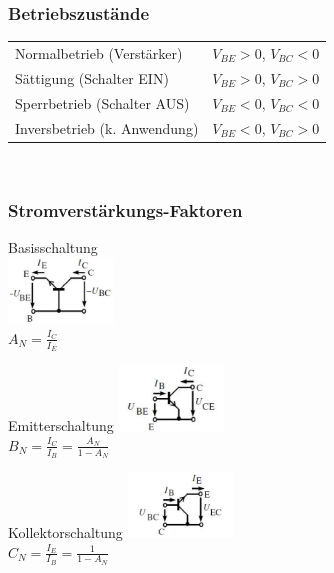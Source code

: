 	\begin{multicols}{2}
	\subsubsection{Betriebszustände}
		\begin{tabular}{l l}
			Normalbetrieb (Verstärker) & $V_{BE} > 0$, $V_{BC} < 0$\\
			Sättigung (Schalter EIN) & $V_{BE} > 0$, $V_{BC} > 0$\\
			Sperrbetrieb (Schalter AUS) & $V_{BE} < 0$, $V_{BC} < 0$\\
			Inversbetrieb (k. Anwendung) & $V_{BE} < 0$, $V_{BC} > 0$
		\end{tabular} \\
	\columnbreak
	\subsubsection{Stromverstärkungs-Faktoren}
		\begin{minipage}[c]{2.8cm}
			Basisschaltung \\
			\includegraphics[width=2.8cm]{images/bip-basissch}\\
			$A_N=\frac{I_C}{I_E}$ \\
		\end{minipage}
		\begin{minipage}[c]{2.8cm}
			Emitterschaltung
			\includegraphics[width=2.8cm]{images/bip-emittersch}\\
			$B_N=\frac{I_C}{I_B}=\frac{A_N}{1-A_N}$ \\
		\end{minipage}
		\begin{minipage}[c]{2.8cm}
			Kollektorschaltung
			\includegraphics[width=2.8cm]{images/bip-kollektorsch}\\
			$C_N=\frac{I_E}{I_B}=\frac{1}{1-A_N}$ \\
		\end{minipage}
	\end{multicols}
